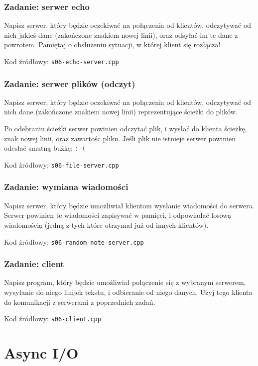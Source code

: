 \documentclass[aspectratio=169]{beamer}
\begin{document}
\begin{frame}
    \frametitle{Zadanie: serwer echo}
    \label{lecture_exercise_3}

    Napisz serwer, który będzie oczekiwać na połączenia od klientów, odczytywać
    od nich jakieś dane (zakończone znakiem nowej linii), oraz odsyłać im te
    dane z powrotem. Pamiętaj o obsłużeniu sytuacji, w której klient się
    rozłącza!

    Kod źródłowy: \texttt{s06-echo-server.cpp}
\end{frame}

\begin{frame}
    \frametitle{Zadanie: serwer plików (odczyt)}
    \label{lecture_exercise_4}

    Napisz serwer, który będzie oczekiwać na połączenia od klientów, odczytywać
    od nich dane (zakończone znakiem nowej linii) reprezentujące ścieżki do
    plików.

    Po odebraniu ścieżki serwer powinien odczytać plik, i wysłać do klienta
    ścieżkę, znak nowej linii, oraz zawartośc pliku. Jeśli plik nie istnieje
    serwer powinien odesłać smutną buźkę: \texttt{:-(}

    Kod źródłowy: \texttt{s06-file-server.cpp}
\end{frame}

\begin{frame}
    \frametitle{Zadanie: wymiana wiadomości}
    \label{lecture_exercise_5}

    Napisz serwer, który będzie umożliwiał klientom wysłanie wiadomości do
    serwera. Serwer powinien te wiadomości zapisywać w pamięci, i odpowiadać
    losową wiadomością (jedną z tych które otrzymał już od innych klientów).

    Kod źródłowy: \texttt{s06-random-note-server.cpp}
\end{frame}

\begin{frame}
    \frametitle{Zadanie: client}
    \label{lecture_exercise_6}

    Napisz program, który będzie umożliwiał połączenie się z wybranym serwerem,
    wysyłanie do niego linijek tekstu, i odbieranie od niego danych. Użyj tego
    klienta do komunikacji z serwerami z poprzednich zadań.

    Kod źródłowy: \texttt{s06-client.cpp}
\end{frame}

\section{Async I/O}
\end{document}
